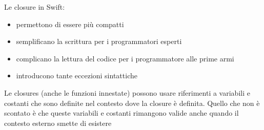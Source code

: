 Le closure in Swift:
\begin{itemize}
    \item permettono di essere più compatti
    \item semplificano la scrittura per i programmatori esperti
    \item complicano la lettura del codice per i programmatore alle prime armi
    \item introducono tante eccezioni sintattiche
\end{itemize} 

Le closures (anche le funzioni innestate) possono usare riferimenti a variabili e costanti che sono definite nel contesto dove la closure è definita. 
Quello che non è scontato è che queste variabili e costanti rimangono valide anche quando il contesto esterno smette di esistere


